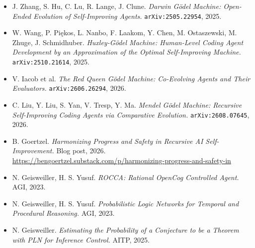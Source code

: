 \documentclass[aspectratio=169]{beamer}
\begin{document}
\begin{frame}
\begin{columns}[t]
      {\fontsize{6}{7.1}\selectfont
       \begin{itemize}\itemsep0.5pt
       \item J. Zhang, S. Hu, C. Lu, R. Lange, J. Clune. \emph{Darwin G\"odel
         Machine: Open-Ended Evolution of Self-Improving Agents.}
         \texttt{arXiv:2505.22954}, 2025.
       \item W. Wang, P. Pi\k{e}kos, L. Nanbo, F. Laakom, Y. Chen,
         M. Ostaszewski, M. Zhuge, J. Schmidhuber. \emph{Huxley-G\"odel Machine:
         Human-Level Coding Agent Development by an Approximation of the Optimal
         Self-Improving Machine.} \texttt{arXiv:2510.21614}, 2025.
       \item V. Iacob et al. \emph{The Red Queen G\"odel Machine: Co-Evolving
         Agents and Their Evaluators.} \texttt{arXiv:2606.26294}, 2026.
       \item C. Liu, Y. Liu, S. Yan, V. Tresp, Y. Ma. \emph{Mendel G\"odel
         Machine: Recursive Self-Improving Coding Agents via Comparative
         Evolution.} \texttt{arXiv:2608.07645}, 2026.
       \item B. Goertzel. \emph{Harmonizing Progress and Safety in
         Recursive AI Self-Improvement.} Blog post, 2026.
       \url{https://bengoertzel.substack.com/p/harmonizing-progress-and-safety-in}
       \item N. Geisweiller, H. S. Yusuf. \emph{ROCCA: Rational OpenCog Controlled
         Agent.} AGI, 2023.
       \item N. Geisweiller, H. S. Yusuf. \emph{Probabilistic Logic Networks for
         Temporal and Procedural Reasoning.} AGI, 2023.
       \item N. Geisweiller. \emph{Estimating the Probability of a Conjecture to
         be a Theorem with PLN for Inference Control.} AITP, 2025.
       \end{itemize}}
  \end{columns}
\end{frame}
\end{document}
